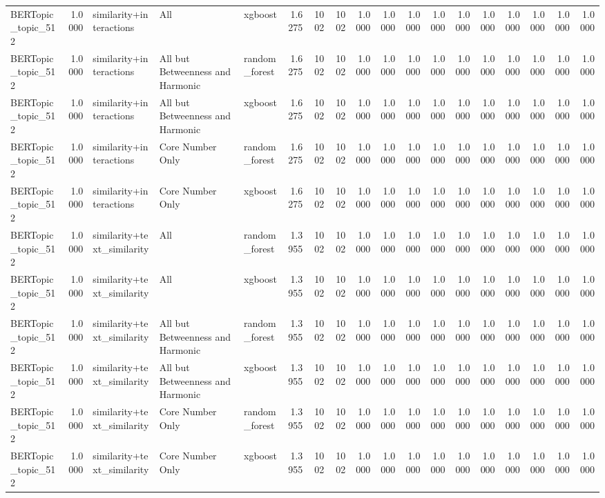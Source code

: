 \begin{tabular}{lrlllrrrrrrrrrrrrr}
BERTopic_topic_512 & 1.0000 & similarity+interactions & All & xgboost & 1.6275 & 1002 & 1002 & 1.0000 & 1.0000 & 1.0000 & 1.0000 & 1.0000 & 1.0000 & 1.0000 & 1.0000 & 1.0000 & 1.0000 \\
BERTopic_topic_512 & 1.0000 & similarity+interactions & All but Betweenness and Harmonic & random_forest & 1.6275 & 1002 & 1002 & 1.0000 & 1.0000 & 1.0000 & 1.0000 & 1.0000 & 1.0000 & 1.0000 & 1.0000 & 1.0000 & 1.0000 \\
BERTopic_topic_512 & 1.0000 & similarity+interactions & All but Betweenness and Harmonic & xgboost & 1.6275 & 1002 & 1002 & 1.0000 & 1.0000 & 1.0000 & 1.0000 & 1.0000 & 1.0000 & 1.0000 & 1.0000 & 1.0000 & 1.0000 \\
BERTopic_topic_512 & 1.0000 & similarity+interactions & Core Number Only & random_forest & 1.6275 & 1002 & 1002 & 1.0000 & 1.0000 & 1.0000 & 1.0000 & 1.0000 & 1.0000 & 1.0000 & 1.0000 & 1.0000 & 1.0000 \\
BERTopic_topic_512 & 1.0000 & similarity+interactions & Core Number Only & xgboost & 1.6275 & 1002 & 1002 & 1.0000 & 1.0000 & 1.0000 & 1.0000 & 1.0000 & 1.0000 & 1.0000 & 1.0000 & 1.0000 & 1.0000 \\
BERTopic_topic_512 & 1.0000 & similarity+text_similarity & All & random_forest & 1.3955 & 1002 & 1002 & 1.0000 & 1.0000 & 1.0000 & 1.0000 & 1.0000 & 1.0000 & 1.0000 & 1.0000 & 1.0000 & 1.0000 \\
BERTopic_topic_512 & 1.0000 & similarity+text_similarity & All & xgboost & 1.3955 & 1002 & 1002 & 1.0000 & 1.0000 & 1.0000 & 1.0000 & 1.0000 & 1.0000 & 1.0000 & 1.0000 & 1.0000 & 1.0000 \\
BERTopic_topic_512 & 1.0000 & similarity+text_similarity & All but Betweenness and Harmonic & random_forest & 1.3955 & 1002 & 1002 & 1.0000 & 1.0000 & 1.0000 & 1.0000 & 1.0000 & 1.0000 & 1.0000 & 1.0000 & 1.0000 & 1.0000 \\
BERTopic_topic_512 & 1.0000 & similarity+text_similarity & All but Betweenness and Harmonic & xgboost & 1.3955 & 1002 & 1002 & 1.0000 & 1.0000 & 1.0000 & 1.0000 & 1.0000 & 1.0000 & 1.0000 & 1.0000 & 1.0000 & 1.0000 \\
BERTopic_topic_512 & 1.0000 & similarity+text_similarity & Core Number Only & random_forest & 1.3955 & 1002 & 1002 & 1.0000 & 1.0000 & 1.0000 & 1.0000 & 1.0000 & 1.0000 & 1.0000 & 1.0000 & 1.0000 & 1.0000 \\
BERTopic_topic_512 & 1.0000 & similarity+text_similarity & Core Number Only & xgboost & 1.3955 & 1002 & 1002 & 1.0000 & 1.0000 & 1.0000 & 1.0000 & 1.0000 & 1.0000 & 1.0000 & 1.0000 & 1.0000 & 1.0000 \\

\end{tabular}

